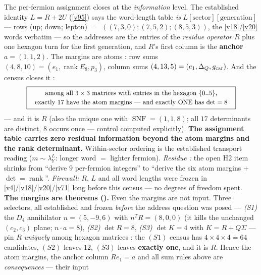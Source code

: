 \begin{keybox}
The per-fermion assignment closes at the \emph{information} level. The established identity
$L=R+2U$ (\vref{v95}) says the word-length table \emph{is} $L[\text{sector}][\text{generation}]$ --- rows
(up; down; lepton) $=$ $((7,3,0);(7,5,2);(8,5,3))$, the \vref{v18}/\vref{v20} words verbatim --- so the addresses are
the entries of the \emph{residue operator} $R$ plus one hexagon turn for the first generation, and
$R$'s first column is the \textbf{anchor} $a=(1,1,2)$. The margins are atoms \mE: row sums
$(4,8,10)=(e_1,\operatorname{rank}E_8,p_3)$, column sums $(4,13,5)=(e_1,\Delta_Q,g_{\mathrm{car}})$. And the
census closes it \mE:
\[
  \boxed{\ \begin{array}{c}
  \text{\small among all $3\times3$ matrices with entries in the hexagon $\{0..5\}$,}\\[1pt]
  \text{\small exactly $17$ have the atom margins --- and exactly ONE has $\det=8$}
  \end{array}\ }
\]
--- and it is $R$ (also the unique one with $\operatorname{SNF}=(1,1,8)$; all $17$ determinants are
distinct, $8$ occurs once --- control computed explicitly). \textbf{The assignment table carries zero
residual information beyond the atom margins and the rank determinant.} Within-sector ordering is the
established transport reading ($m\sim\lambda_Y^L$: longer word $=$ lighter fermion). \emph{Residue
\mC:} the open H2 item shrinks from ``derive $9$ per-fermion integers'' to ``derive the six atom
margins $+$ $\det=\operatorname{rank}$''. \emph{Firewall:} $R$, $L$ and all word lengths were frozen in
\vref{v4}/\vref{v18}/\vref{v20}/\vref{v71} long before this census --- no degrees of freedom spent.
\smallskip\\
\noindent\textbf{The margins are theorems ().} Even the margins are not
input. Three selectors, all established and frozen \emph{before} the address question was posed ---
\emph{(S1)} the $D_4$ annihilator $n=(5,-9,6)$ with $n^TR=(8,0,0)$ (it kills the unchanged
$(c_2,c_3)$ plane; $n\!\cdot\!a=8$), \emph{(S2)} $\det R=8$, \emph{(S3)} $\det K=4$ with $K=R+Q\Sigma$
--- pin $R$ \emph{uniquely} among hexagon matrices \mE: the $(S1)$ census has $4\times4\times4=64$
candidates, $(S2)$ leaves $12$, $(S3)$ leaves \textbf{exactly one}, and it is $R$. Hence the atom
margins, the anchor column $Re_1=a$ and all sum rules above are \emph{consequences} --- their input

\end{keybox}
